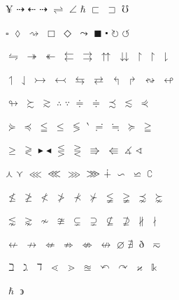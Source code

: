 \documentclass{article}
\begin{document}
$\yen$ $\dashrightarrow$ $\dashleftarrow$ $\dasharrow$ $\rightleftharpoons$ $\angle$ $\hbar$ $\sqsubset$ $\sqsupset$ $\mho$

$\square$ $\lozenge$ $\rightsquigarrow$ $\Box$ $\Diamond$ $\leadsto$ $\blacksquare$ $\centerdot$ $\circlearrowright$ $\circlearrowleft$

$\leftrightharpoons$ $\twoheadrightarrow$ $\twoheadleftarrow$ $\leftleftarrows$ $\rightrightarrows$ $\upuparrows$ $\downdownarrows$ $\upharpoonright$ $\restriction$ $\downharpoonright$

$\upharpoonleft$ $\downharpoonleft$ $\rightarrowtail$ $\leftarrowtail$ $\leftrightarrows$ $\rightleftarrows$ $\Lsh$ $\Rsh$ $\leftrightsquigarrow$ $\looparrowleft$

$\looparrowright$ $\succsim$ $\gtrsim$ $\therefore$ $\because$ $\doteqdot$ $\Doteq$ $\precsim$ $\lesssim$ $\curlyeqprec$

$\curlyeqsucc$ $\preccurlyeq$ $\leqq$ $\leqslant$ $\lessgtr$ $\backprime$ $\risingdotseq$ $\fallingdotseq$ $\succcurlyeq$ $\geqq$

$\geqslant$ $\gtrless$ $\blacktriangleright$ $\blacktriangleleft$ $\lesseqgtr$ $\gtreqless$ $\Rrightarrow$ $\Lleftarrow$ $\measuredangle$ $\sphericalangle$

$\curlywedge$ $\curlyvee$ $\lll$ $\llless$ $\ggg$ $\gggtr$ $\dotplus$ $\backsim$ $\backsimeq$ $\complement$

$\nleq$ $\ngeq$ $\nless$ $\ngtr$ $\nprec$ $\nsucc$ $\lneqq$ $\gneqq$ $\precnsim$ $\succnsim$

$\lnsim$ $\gnsim$ $\nsim$ $\ncong$ $\subsetneq$ $\supsetneq$ $\nsubseteq$ $\nsupseteq$ $\nparallel$ $\nmid$

$\nleftarrow$ $\nrightarrow$ $\nLeftarrow$ $\nRightarrow$ $\nLeftrightarrow$ $\nleftrightarrow$ $\varnothing$ $\nexists$ $\eth$ $\eqsim$

$\beth$ $\gimel$ $\daleth$ $\lessdot$ $\gtrdot$ $\approxeq$ $\curvearrowleft$ $\curvearrowright$ $\varkappa$ $\Bbbk$

$\hslash$ $\backepsilon$
\end{document}

